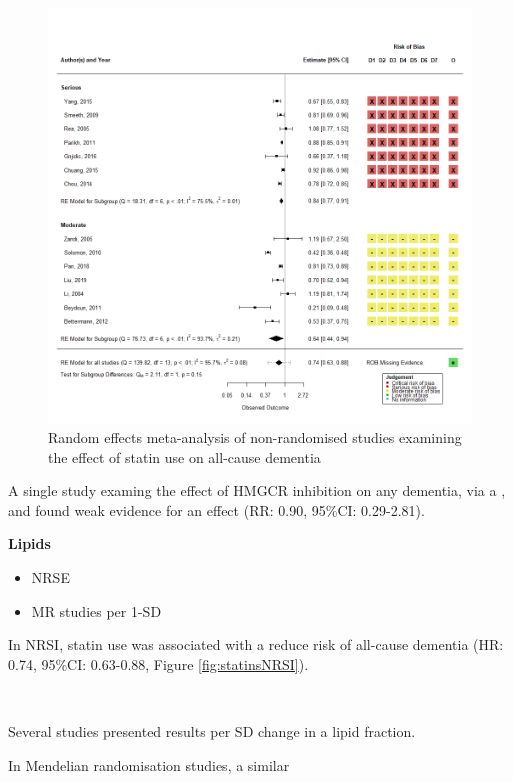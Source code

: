 \documentclass[a4paper, twoside]{templates/ociamthesis}
\begin{document}
\begin{figure}[H]
\includegraphics[width=1\linewidth]{figures/sys-rev/fp_obs_Statin-Ever_Dementia} \caption[Random effects meta-analysis of statins on all-cause dementia]{Random effects meta-analysis of non-randomised studies examining the effect of statin use on all-cause dementia}\label{fig:obsStatinDementiaFig}
\end{figure}

A single study examing the effect of HMGCR inhibition on any dementia, via a , and found weak evidence for an effect (RR: 0.90, 95\%CI: 0.29-2.81).

\textbf{Lipids}

\begin{itemize}
\item
  NRSE
\item
  MR studies per 1-SD
\end{itemize}

In NRSI, statin use was associated with a reduce risk of all-cause dementia (HR: 0.74, 95\%CI: 0.63-0.88, Figure \ref{fig:statinsNRSI}).

~

Several studies presented results per SD change in a lipid fraction.

In Mendelian randomisation studies, a similar

~
\end{document}
